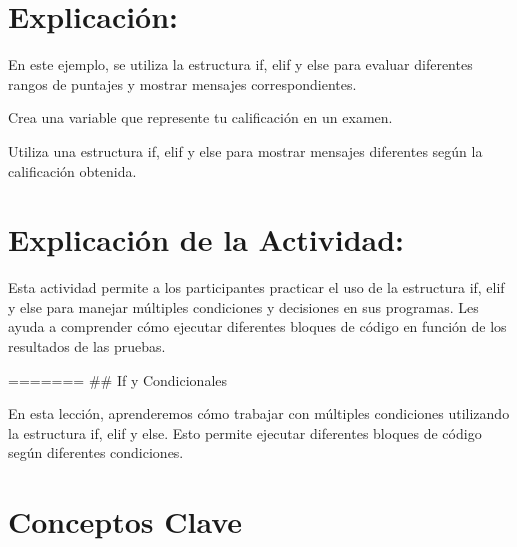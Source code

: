 \documentclass[
  a4paper,
  DIV=11,
  numbers=noendperiod,
  onepage,
  openany]{scrreprt}
\begin{document}
\hypertarget{explicaciuxf3n-30}{%
\section{Explicación:}\label{explicaciuxf3n-30}}

En este ejemplo, se utiliza la estructura if, elif y else para evaluar
diferentes rangos de puntajes y mostrar mensajes correspondientes.

\begin{tcolorbox}[enhanced jigsaw, colbacktitle=quarto-callout-important-color!10!white, toprule=.15mm, leftrule=.75mm, titlerule=0mm, opacityback=0, rightrule=.15mm, opacitybacktitle=0.6, breakable, left=2mm, coltitle=black, title=\textcolor{quarto-callout-important-color}{\faExclamation}\hspace{0.5em}{Actividad Práctica:}, toptitle=1mm, bottomtitle=1mm, arc=.35mm, bottomrule=.15mm, colback=white, colframe=quarto-callout-important-color-frame]

Crea una variable que represente tu calificación en un examen.

Utiliza una estructura if, elif y else para mostrar mensajes diferentes
según la calificación obtenida.

\end{tcolorbox}

\hypertarget{explicaciuxf3n-de-la-actividad-28}{%
\section{Explicación de la
Actividad:}\label{explicaciuxf3n-de-la-actividad-28}}

Esta actividad permite a los participantes practicar el uso de la
estructura if, elif y else para manejar múltiples condiciones y
decisiones en sus programas. Les ayuda a comprender cómo ejecutar
diferentes bloques de código en función de los resultados de las
pruebas.

======= \#\# If y Condicionales

En esta lección, aprenderemos cómo trabajar con múltiples condiciones
utilizando la estructura if, elif y else. Esto permite ejecutar
diferentes bloques de código según diferentes condiciones.

\hypertarget{conceptos-clave-31}{%
\section{Conceptos Clave}\label{conceptos-clave-31}}
\end{document}
